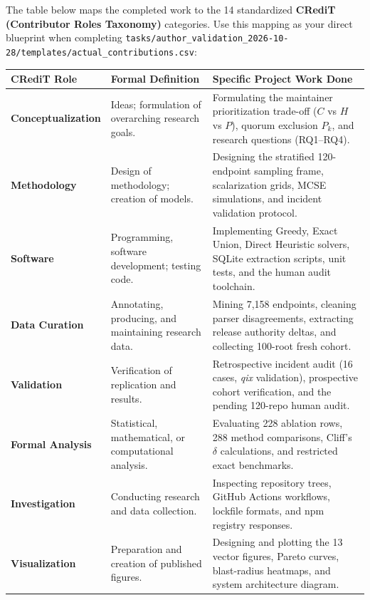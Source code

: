 \documentclass[11pt,a4paper]{article}
\begin{document}
The table below maps the completed work to the 14 standardized \textbf{CRediT (Contributor Roles Taxonomy)} categories. Use this mapping as your direct blueprint when completing \nolinkurl{tasks/author_validation_2026-10-28/templates/actual_contributions.csv}:

\begin{table}[ht]
\centering
\small
\begin{tabularx}{\linewidth}{l p{4cm} X}
\toprule
\textbf{CRediT Role} & \textbf{Formal Definition} & \textbf{Specific Project Work Done} \\
\midrule
\textbf{Conceptualization} & Ideas; formulation of overarching research goals. & Formulating the maintainer prioritization trade-off ($C$ vs $H$ vs $P$), quorum exclusion $P_k$, and research questions (RQ1--RQ4). \\
\addlinespace
\textbf{Methodology} & Design of methodology; creation of models. & Designing the stratified 120-endpoint sampling frame, scalarization grids, MCSE simulations, and incident validation protocol. \\
\addlinespace
\textbf{Software} & Programming, software development; testing code. & Implementing Greedy, Exact Union, Direct Heuristic solvers, SQLite extraction scripts, unit tests, and the human audit toolchain. \\
\addlinespace
\textbf{Data Curation} & Annotating, producing, and maintaining research data. & Mining 7,158 endpoints, cleaning parser disagreements, extracting release authority deltas, and collecting 100-root fresh cohort. \\
\addlinespace
\textbf{Validation} & Verification of replication and results. & Retrospective incident audit (16 cases, \textit{qix} validation), prospective cohort verification, and the pending 120-repo human audit. \\
\addlinespace
\textbf{Formal Analysis} & Statistical, mathematical, or computational analysis. & Evaluating 228 ablation rows, 288 method comparisons, Cliff's $\delta$ calculations, and restricted exact benchmarks. \\
\addlinespace
\textbf{Investigation} & Conducting research and data collection. & Inspecting repository trees, GitHub Actions workflows, lockfile formats, and npm registry responses. \\
\addlinespace
\textbf{Visualization} & Preparation and creation of published figures. & Designing and plotting the 13 vector figures, Pareto curves, blast-radius heatmaps, and system architecture diagram. \\

\end{tabularx}
\end{table}
\end{document}
